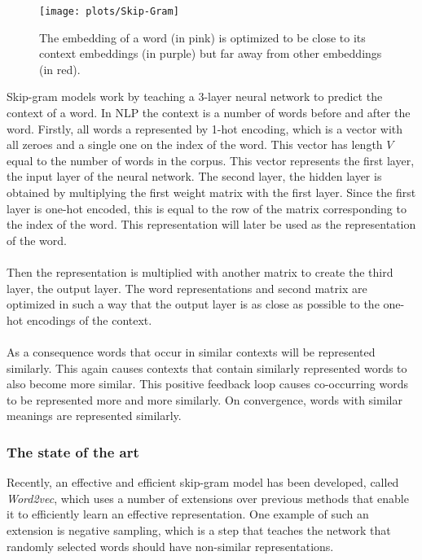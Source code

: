 \documentclass{article}
\begin{document}
 \begin{figure}[H]
 \centering
 \texttt{[image: plots/Skip-Gram]}
 \caption[Skip-Gram model]{The embedding of a word (in pink) is optimized to be close to its context embeddings (in purple) but far away from other embeddings (in red).}
 \label{Skip-Gram-img2}
 \end{figure}
 
 Skip-gram models work by teaching a 3-layer neural network to predict the context of a word. In NLP the context is a number of words before and after the word. Firstly, all words a represented by 1-hot encoding, which is a vector with all zeroes and a single one on the index of the word. This vector has length $V$ equal to the number of words in the corpus. This vector represents the first layer, the input layer of the neural network. The second layer, the hidden layer is obtained by multiplying the first weight matrix with the first layer. Since the first layer is one-hot encoded, this is equal to the row of the matrix corresponding to the index of the word. This representation will later be used as the representation of the word.
 \paragraph{}
 Then the representation is multiplied with another matrix to create the third layer, the output layer. The word representations and second matrix are optimized in such a way that the output layer is as close as possible to the one-hot encodings of the context.
 \paragraph{}
 As a consequence words that occur in similar contexts will be represented similarly. This again causes contexts that contain similarly represented words to also become more similar. This positive feedback loop causes co-occurring words to be represented more and more similarly. On convergence, words with similar meanings are represented similarly.
 
 \subsubsection{The state of the art}
 Recently, an effective and efficient skip-gram model has been developed, called \emph{Word2vec}, which uses a number of extensions over previous methods that enable it to efficiently learn an effective representation\cite{w2v}. One example of such an extension is negative sampling, which is a step that teaches the network that randomly selected words should have non-similar representations.
\end{document}
